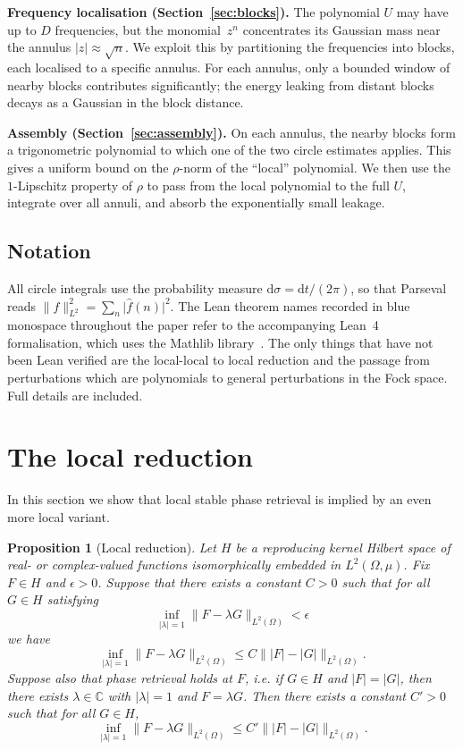 \documentclass[11pt]{amsart}
\newtheorem{proposition}[theorem]{Proposition}
\theoremstyle{definition}
\theoremstyle{remark}
\begin{document}
\medskip
\noindent
\textbf{Frequency localisation (Section~\ref{sec:blocks}).}\;
The polynomial $U$ may have up to $D$ frequencies, but the monomial~$z^n$
concentrates its Gaussian mass near the annulus $\lvert z \rvert \approx \sqrt{n}$.
We exploit this by partitioning the frequencies into blocks, each localised
to a specific annulus.  For each annulus, only a bounded window of nearby
blocks contributes significantly; the energy leaking from distant blocks
decays as a Gaussian in the block distance.

\medskip
\noindent
\textbf{Assembly (Section~\ref{sec:assembly}).}\;
On each annulus, the nearby blocks form a trigonometric polynomial to which
one of the two circle estimates applies.  This gives a uniform bound on the
$\rho$-norm of the ``local'' polynomial.  We then use the $1$-Lipschitz
property of $\rho$ to pass from the local polynomial to the full $U$,
integrate over all annuli, and absorb the exponentially small leakage.

\subsection{Notation}\label{sec:notation}

All circle integrals use the probability measure
$\mathrm{d}\sigma = \mathrm{d} t/(2\pi)$, so that Parseval reads
$\lVert f \rVert_{L^2}^2 = \sum_n \lvert \hat{f}(n) \rvert^2$.
The Lean theorem names recorded in blue monospace throughout the
paper refer to the accompanying Lean~4 formalisation, which uses the Mathlib
library~\cite{mathlib}.  The only things that have not been Lean verified are
the local-local to local reduction and the passage from perturbations which
are polynomials to general perturbations in the Fock space. Full details are
included.

\section{The local reduction}\label{sec:local-reduction}

In this section we show that local stable phase retrieval is implied by an
even more local variant.

\begin{proposition}[Local reduction]\label{prop:local-reduction}
Let \(H\) be a reproducing kernel Hilbert space of real- or complex-valued
functions isomorphically embedded in \(L^2(\Omega,\mu)\). Fix \(F\in H\) and
\(\epsilon>0\). Suppose that there exists a constant \(C>0\) such that for
all \(G\in H\) satisfying
\[
\inf_{\lvert \lambda \rvert=1}\lVert F-\lambda G \rVert_{L^2(\Omega)}<\epsilon
\]
we have
\[
\inf_{\lvert \lambda \rvert=1}\lVert F-\lambda G \rVert_{L^2(\Omega)}
\le
C\lVert \lvert F \rvert-\lvert G \rvert \rVert_{L^2(\Omega)}.
\]
Suppose also that phase retrieval holds at \(F\), i.e. if \(G\in H\) and
\(\lvert F \rvert=\lvert G \rvert\), then there exists \(\lambda\in\mathbb{C}\) with
\(\lvert \lambda \rvert=1\) and \(F=\lambda G\). Then there exists a constant
\(C'>0\) such that for all \(G\in H\),
\[
\inf_{\lvert \lambda \rvert=1}\lVert F-\lambda G \rVert_{L^2(\Omega)}
\le
C'\lVert \lvert F \rvert-\lvert G \rvert \rVert_{L^2(\Omega)}.
\]
\end{proposition}
\end{document}
